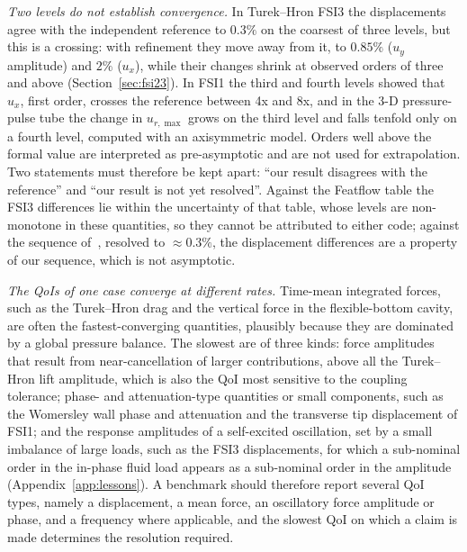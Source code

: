 \emph{Two levels do not establish convergence.}
In Turek--Hron FSI3 the displacements agree with the independent reference to $0.3\%$ on the coarsest of three levels, but this is a crossing: with refinement they move away from it, to $0.85\%$ ($u_y$ amplitude) and $2\%$ ($u_x$), while their changes shrink at observed orders of three and above (Section~\ref{sec:fsi23}).
In FSI1 the third and fourth levels showed that $u_x$, first order, crosses the reference between 4x and 8x, and in the 3-D pressure-pulse tube the change in $u_{r,\max}$ grows on the third level and falls tenfold only on a fourth level, computed with an axisymmetric model.
Orders well above the formal value are interpreted as pre-asymptotic and are not used for extrapolation.
Two statements must therefore be kept apart: ``our result disagrees with the reference'' and ``our result is not yet resolved''.
Against the Featflow table the FSI3 differences lie within the uncertainty of that table, whose levels are non-monotone in these quantities, so they cannot be attributed to either code; against the sequence of~\citet{Failer2020}, resolved to $\approx0.3\%$, the displacement differences are a property of our sequence, which is not asymptotic.

\emph{The QoIs of one case converge at different rates.}
Time-mean integrated forces, such as the Turek--Hron drag and the vertical force in the flexible-bottom cavity, are often the fastest-converging quantities, plausibly because they are dominated by a global pressure balance.
The slowest are of three kinds:
force amplitudes that result from near-cancellation of larger contributions, above all the Turek--Hron lift amplitude, which is also the QoI most sensitive to the coupling tolerance;
phase- and attenuation-type quantities or small components, such as the Womersley wall phase and attenuation and the transverse tip displacement of FSI1;
and the response amplitudes of a self-excited oscillation, set by a small imbalance of large loads, such as the FSI3 displacements, for which a sub-nominal order in the in-phase fluid load appears as a sub-nominal order in the amplitude (Appendix~\ref{app:lessons}).
A benchmark should therefore report several QoI types, namely a displacement, a mean force, an oscillatory force amplitude or phase, and a frequency where applicable, and the slowest QoI on which a claim is made determines the resolution required.

